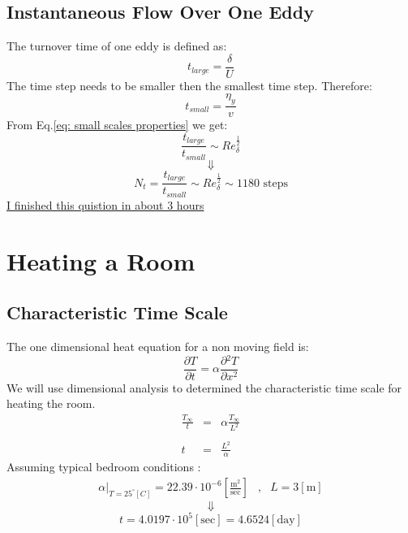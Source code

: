 \documentclass[11pt, a4paper]{article}
\newcommand{\parder}[2]{\frac{\partial {#1}}{\partial {#2}}}
\begin{document}
\subsection{Instantaneous Flow Over One Eddy}
The turnover time of one eddy is defined as:
\begin{equation}
    t_{large}=\frac{\delta}{U}
\end{equation}
The time step needs to be smaller then the smallest time step. Therefore:
\begin{equation}
    t_{small}=\frac{\eta_y}{v}
\end{equation}
From Eq.\ref{eq: small scales properties} we get:
\begin{equation}
    \frac{t_{large}}{t_{small}}\sim{Re}_\delta^\frac{1}{2}
\end{equation}
\begin{equation*}
    \Downarrow
\end{equation*}
\begin{equation}
    N_t=\frac{t_{large}}{t_{small}}\sim{Re}_\delta^\frac{1}{2}\sim1180\text{ steps}
\end{equation}
\underline{I finished this quistion in about 3 hours}

\section{Heating a Room}
\subsection{Characteristic Time Scale}
The one dimensional heat equation for a non moving field is:
\begin{equation}
    \parder{T}{t}=\alpha\parder{^2T}{x^2}
\end{equation}
We will use dimensional analysis to determined the characteristic time scale for heating the room.
\begin{equation}
    \begin{array}{rcl}
        \displaystyle\frac{T_\infty}{t} & = & \displaystyle\alpha\frac{T_\infty}{L^2} \\\\
        t & = & \displaystyle\frac{L^2}{\alpha}
    \end{array}
\end{equation}
Assuming typical bedroom conditions \cite{air_thermal_diffusivity}:
\begin{equation*}
    \begin{matrix}
        \displaystyle\left.\alpha\right|_\text{$T=25^\circ[C]$}=22.39\cdot10^{-6}\left[\frac{\mathrm{m}^2}{\mathrm{sec}}\right] &,& L=3\left[\mathrm{m}\right]
    \end{matrix}
\end{equation*}
\begin{equation*}
    \Downarrow
\end{equation*}
\begin{equation}
    t=4.0197\cdot10^5\left[\mathrm{sec}\right]=4.6524\left[\mathrm{day}\right]
\end{equation}
\end{document}
